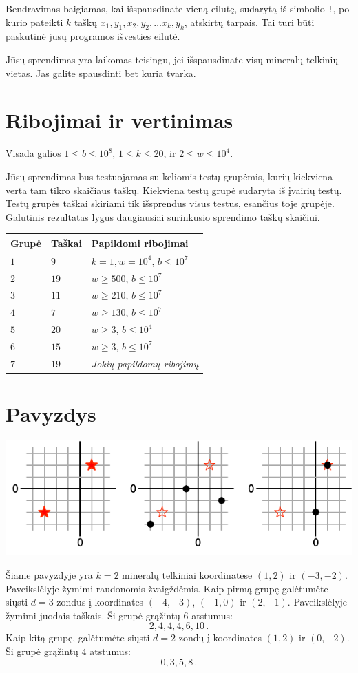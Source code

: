Bendravimas baigiamas, kai išspausdinate vieną eilutę, sudarytą iš simbolio \texttt{!}, po kurio pateikti
$k$ taškų \newline $x_1, y_1, x_2, y_2, \ldots x_k, y_k$, atskirtų tarpais.
Tai turi būti paskutinė jūsų programos išvesties eilutė.

Jūsų sprendimas yra laikomas teisingu, jei išspausdinate visų mineralų telkinių vietas. 
Jas galite spausdinti bet kuria tvarka.

\section*{Ribojimai ir vertinimas}

Visada galios
$1\leq b \leq 10^8$, %
$1 \leq k \leq 20$, %
ir
$2 \le w \le 10^4$. %

Jūsų sprendimas bus testuojamas su keliomis testų grupėmis, kurių kiekviena verta tam tikro skaičiaus taškų.
Kiekviena testų grupė sudaryta iš įvairių testų.
Testų grupės taškai skiriami tik išsprendus visus testus, esančius toje grupėje.
Galutinis rezultatas lygus daugiausiai surinkusio sprendimo taškų skaičiui.

\medskip
\begin{tabular}{lll}
Grupė & Taškai & Papildomi ribojimai \\\hline
  $1$ & $9$ & $k = 1, w = 10^4$, $b \le 10^7$\\
  $2$ & $19$ & $w \ge 500$, $b \le 10^7$\\
  $3$ & $11$ & $w \ge 210$, $b \le 10^7$\\
  $4$ & $7$ & $w \ge 130$, $b \le 10^7$\\
  $5$ & $20$ & $w \ge 3$, $b \le 10^4$\\
  $6$ & $15$ & $w \ge 3$, $b \le 10^7$\\
  $7$ & $19$ & \emph{Jokių papildomų ribojimų}
\end{tabular}

\section*{Pavyzdys}

\includegraphics[width=.6\textwidth]{img/sample1.pdf}

Šiame pavyzdyje yra $k=2$ mineralų telkiniai koordinatėse $(1,2)$ ir $(-3,-2)$. Paveikslėlyje žymimi raudonomis žvaigždėmis.
Kaip pirmą grupę galėtumėte siųsti $d=3$ zondus į koordinates $(-4,-3)$, $(-1, 0)$ ir $(2,-1)$. Paveikslėlyje žymimi juodais taškais.
Ši grupė grąžintų $6$ atstumus: \[
  2, 4, 4, 4, 6, 10\,.
\]
Kaip kitą grupę, galėtumėte siųsti $d=2$ zondų į koordinates $(1,2)$ ir $(0,-2)$.
Ši grupė grąžintų $4$ atstumus: \[
  0, 3, 5, 8\,.
\]
